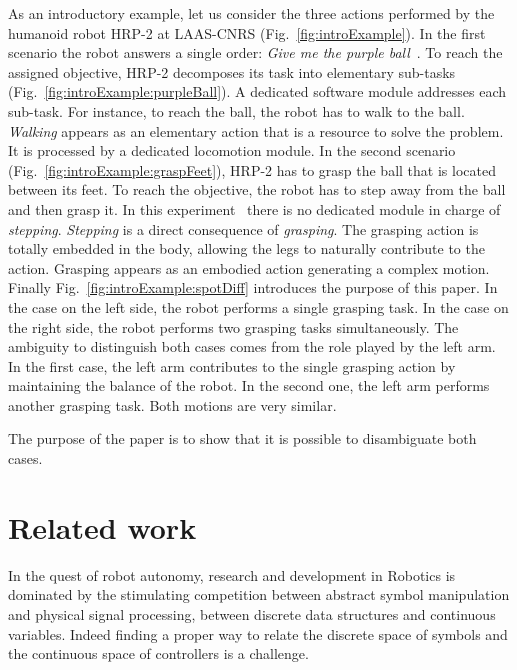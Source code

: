 \documentclass[letterpaper, 10pt, conference]{ieeeconf}      %
\begin{document}
As an introductory example, let us consider the three actions performed by the
humanoid robot HRP-2 at LAAS-CNRS (Fig.~\ref{fig:introExample}). In the first scenario the robot
answers a single order: \emph{Give me the purple ball}~\cite{yoshida07}. To reach the assigned
objective, HRP-2 decomposes its task into elementary sub-tasks
(Fig.~\ref{fig:introExample:purpleBall}). A dedicated software module addresses each
sub-task. For instance,
to reach the ball, the robot has to walk to the ball. \emph{Walking} appears as an
elementary action that is a resource to solve the problem. It is processed by a
dedicated locomotion module. In the second scenario (Fig.~\ref{fig:introExample:graspFeet}),
HRP-2 has to grasp the ball that is located between its feet. To reach the
objective, the robot has to step away from the ball and then grasp it. In this
experiment~\cite{kanoun10} there is no dedicated module in charge of \emph{stepping}. \emph{Stepping} is
a direct consequence of \emph{grasping}. The grasping action is totally embedded in
the body, allowing the legs to naturally contribute to the action. Grasping
appears as an embodied action generating a complex motion. Finally Fig.~\ref{fig:introExample:spotDiff}
introduces the purpose of this paper. In the case on the left side, the robot
performs a single grasping task. In the case on the right side, the robot
performs two grasping tasks simultaneously. The ambiguity to distinguish both
cases comes from the role played by the left arm. In the first case, the left
arm contributes to the single grasping action by maintaining the balance of the
robot. In the second one, the left arm performs another grasping task. Both
motions are very similar. 

The purpose of the paper is to show that it is possible to disambiguate both
cases.

\section{Related work}
In the quest of robot autonomy, research and development in Robotics is
dominated by the stimulating competition between abstract symbol manipulation and physical signal
processing, between discrete data structures and continuous variables.
Indeed finding a proper way to relate the discrete space of symbols and the continuous space
of controllers is a challenge.\\
\end{document}
